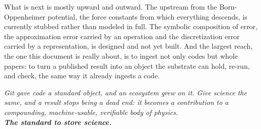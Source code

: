 \documentclass[11pt,a4paper]{article}
\begin{document}
What is next is mostly upward and outward. The upstream from the
Born-Oppenheimer potential, the force constants from which everything descends, is
currently stubbed rather than modeled in full. The symbolic composition of error,
the approximation error carried by an operation and the discretization error
carried by a representation, is designed and not yet built. And the largest reach,
the one this document is really about, is to ingest not only codes but whole
papers: to turn a published result into an object the substrate can hold, re-run,
and check, the same way it already ingests a code.

\bigskip
\begin{center}
\color{abstrcol}\itshape
Git gave code a standard object, and an ecosystem grew on it. Give science the
same, and a result stops being a dead end: it becomes a contribution to a
compounding, machine-usable, verifiable body of physics.\\[0.5em]
\normalfont\bfseries The standard to store science.
\end{center}
\end{document}
